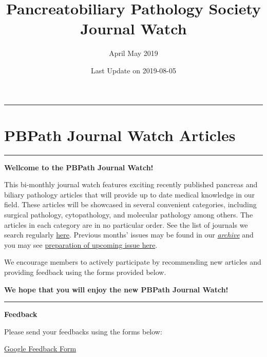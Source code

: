 \documentclass[]{article}
\title{Pancreatobiliary Pathology Society Journal Watch}
\subtitle{April May 2019}
\author{}
\date{Last Update on 2019-08-05}
\begin{document}
\maketitle

{
\setcounter{tocdepth}{5}
\tableofcontents
}
\begin{center}\rule{0.5\linewidth}{\linethickness}\end{center}

\hypertarget{pbpath-journal-watch-articles}{%
\section{PBPath Journal Watch
Articles}\label{pbpath-journal-watch-articles}}

\begin{center}\rule{0.5\linewidth}{\linethickness}\end{center}

\textbf{Wellcome to the PBPath Journal Watch!}

This bi-monthly journal watch features exciting recently published
pancreas and biliary pathology articles that will provide up to date
medical knowledge in our field. These articles will be showcased in
several convenient categories, including surgical pathology,
cytopathology, and molecular pathology among others. The articles in
each category are in no particular order. See the list of journals we
search regularly \href{http://pbpath.org/pbpath-journal-watch/}{here}.
Previous months' issues may be found in our
\emph{\href{http://pbpath.org/journal-watch-archive/}{archive}} and you
may see
\href{http://pbpath.org/journal-watch-upcoming-issue/}{preparation of
upcoming issue here}.

We encourage members to actively participate by recommending new
articles and providing feedback using the forms provided below.

\textbf{We hope that you will enjoy the new PBPath Journal Watch!}

\begin{center}\rule{0.5\linewidth}{\linethickness}\end{center}

\textbf{Feedback}

Please send your feedbacks using the forms below:

\href{https://docs.google.com/forms/d/e/1FAIpQLSeD3Z9J6Y7eMmiyM12f_SfAmHUlykb1zxZcwO6lg7cebGYQIQ/viewform}{Google
Feedback Form}

\hypertarget{disqus_thread}{}
\end{document}
